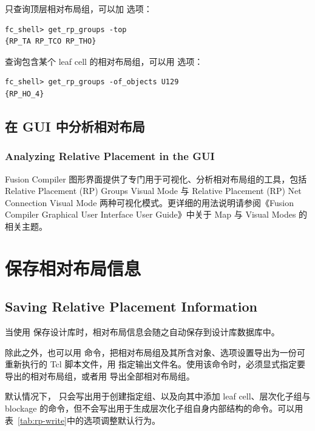 只查询顶层相对布局组，可以加  选项：
\begin{lstlisting}
fc_shell> get_rp_groups -top
{RP_TA RP_TCO RP_THO}
\end{lstlisting}

查询包含某个 leaf cell 的相对布局组，可以用  选项：
\begin{lstlisting}
fc_shell> get_rp_groups -of_objects U129
{RP_HO_4}
\end{lstlisting}

\subsection{在 GUI 中分析相对布局}
\subsubsection*{Analyzing Relative Placement in the GUI}

Fusion Compiler 图形界面提供了专门用于可视化、分析相对布局组的工具，包括 Relative Placement (RP) Groups Visual Mode 与 Relative Placement (RP) Net Connection Visual Mode 两种可视化模式。更详细的用法说明请参阅《Fusion Compiler Graphical User Interface User Guide》中关于 Map 与 Visual Modes 的相关主题。

\section{保存相对布局信息}
\subsection*{Saving Relative Placement Information}

当使用  保存设计库时，相对布局信息会随之自动保存到设计库数据库中。

除此之外，也可以用  命令，把相对布局组及其所含对象、选项设置导出为一份可重新执行的 Tcl 脚本文件，用  指定输出文件名。使用该命令时，必须显式指定要导出的相对布局组，或者用  导出全部相对布局组。

默认情况下， 只会写出用于创建指定组、以及向其中添加 leaf cell、层次化子组与 blockage 的命令，但不会写出用于生成层次化子组自身内部结构的命令。可以用表~\ref{tab:rp-write}中的选项调整默认行为。


